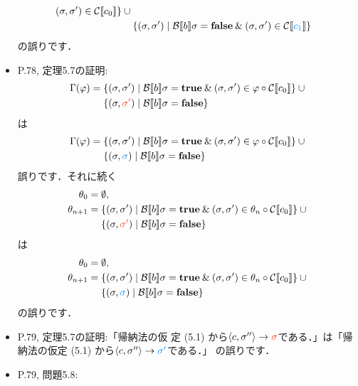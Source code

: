 \documentclass[12pt,titlepage,twoside,openright,dvipdfmx]{jsbook}
\newcommand\old[1]{%
  \textcolor[rgb]{1.0,0.25,0.1}{#1}%
  }
\newcommand\new[1]{%
  \textcolor[rgb]{0,0.55,1.0}{#1}%
  }
\theoremstyle{definition}
\begin{document}
\begin{itemize}
\begin{align*}
        (\sigma,\sigma')\in\denotation{C}{c_0}\}\cup {} \\
      & \{(\sigma,\sigma')\mid  \denotation{B}{b}\sigma=\mathbf{false}\AND
        (\sigma,\sigma')\in\denotation{C}{\new{c_1}}\}  
    \end{align*}
    の誤りです．
  \item P.78, 定理5.7の証明:
    \begin{align*}
      \Gamma(\varphi) = {}
      & \{(\sigma,\sigma')\mid  \denotation{B}{b}\sigma=\mathbf{true}\AND
        (\sigma,\sigma')\in\varphi\circ\denotation{C}{c_0}\} \cup {} \\
      & \{(\sigma,\old{\sigma'})\mid  \denotation{B}{b}\sigma=\mathbf{false}\}
    \end{align*}
    は
    \begin{align*}
      \Gamma(\varphi) = {}
      & \{(\sigma,\sigma')\mid  \denotation{B}{b}\sigma=\mathbf{true}\AND
        (\sigma,\sigma')\in\varphi\circ\denotation{C}{c_0}\} \cup {} \\
      & \{(\sigma,\new{\sigma})\mid  \denotation{B}{b}\sigma=\mathbf{false}\}
    \end{align*}
    誤りです．それに続く
    \begin{align*}
      \theta_0 = {} & \emptyset, \\
      \theta_{n+1} = {}
                    & \{(\sigma,\sigma')\mid  \denotation{B}{b}\sigma=\mathbf{true}\AND
                      (\sigma,\sigma')\in\theta_n\circ\denotation{C}{c_0}\} \cup {}\\
                    & \{(\sigma,\old{\sigma'})\mid  \denotation{B}{b}\sigma=\mathbf{false}\}
    \end{align*}
    は
    \begin{align*}
      \theta_0 = {} & \emptyset, \\
      \theta_{n+1} = {}
                    & \{(\sigma,\sigma')\mid  \denotation{B}{b}\sigma=\mathbf{true}\AND
                      (\sigma,\sigma')\in\theta_n\circ\denotation{C}{c_0}\} \cup {}\\
                    & \{(\sigma,\new{\sigma})\mid  \denotation{B}{b}\sigma=\mathbf{false}\}
    \end{align*}
    の誤りです．
  \item P.79, 定理5.7の証明:「帰納法の仮
    定 (5.1) から$\tuple{c,\sigma''}\rightarrow\old{\sigma}$である．」は「帰
    納法の仮定 (5.1) から$\tuple{c,\sigma''}\rightarrow\new{\sigma'}$である．」
    の誤りです．
  \item P.79, 問題5.8:

\end{itemize}
\end{document}
